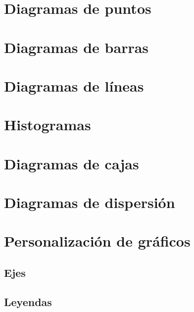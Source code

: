 \documentclass[
]{book}
\theoremstyle{definition}
\theoremstyle{definition}
\theoremstyle{definition}
\theoremstyle{definition}
\theoremstyle{remark}
\begin{document}
\hypertarget{diagramas-de-puntos}{%
\section{Diagramas de puntos}\label{diagramas-de-puntos}}

\hypertarget{diagramas-de-barras}{%
\section{Diagramas de barras}\label{diagramas-de-barras}}

\hypertarget{diagramas-de-luxedneas}{%
\section{Diagramas de líneas}\label{diagramas-de-luxedneas}}

\hypertarget{histogramas}{%
\section{Histogramas}\label{histogramas}}

\hypertarget{diagramas-de-cajas}{%
\section{Diagramas de cajas}\label{diagramas-de-cajas}}

\hypertarget{diagramas-de-dispersiuxf3n}{%
\section{Diagramas de dispersión}\label{diagramas-de-dispersiuxf3n}}

\hypertarget{personalizaciuxf3n-de-gruxe1ficos}{%
\section{Personalización de gráficos}\label{personalizaciuxf3n-de-gruxe1ficos}}

\hypertarget{ejes}{%
\subsection{Ejes}\label{ejes}}

\hypertarget{leyendas}{%
\subsection{Leyendas}\label{leyendas}}
\end{document}

